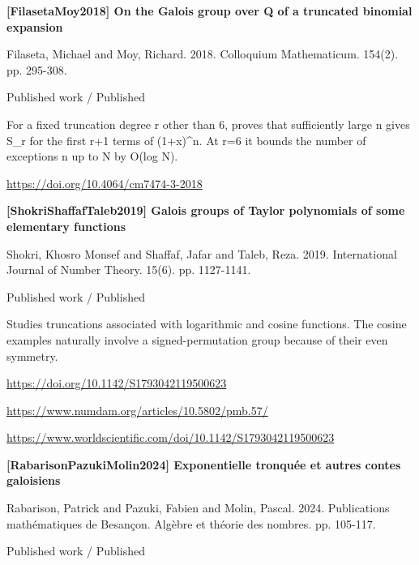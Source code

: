 \documentclass[11pt,a4paper,oneside,openany]{book}
\begin{document}
\hypertarget{ref:FilasetaMoy2018}{}
{\sffamily\bfseries\color{atlasgreen}[FilasetaMoy2018] On the Galois group over Q of a truncated binomial expansion}\par
\color{black} Filaseta, Michael and Moy, Richard. 2018. Colloquium Mathematicum. 154(2). pp. 295-308.\par
{\small\sffamily\color{atlasgold}Published work / Published}\par
\color{black} For a fixed truncation degree r other than 6, proves that sufficiently large n gives S\_\allowbreak{}r for the first r+1 terms of (1+x)\textasciicircum{}n. At r=6 it bounds the number of exceptions n up to N by O(log N).\par
{\footnotesize\url{https://doi.org/10.4064/cm7474-3-2018}}\par
\vspace{9pt}
\hypertarget{ref:ShokriShaffafTaleb2019}{}
{\sffamily\bfseries\color{atlasgreen}[ShokriShaffafTaleb2019] Galois groups of Taylor polynomials of some elementary functions}\par
\color{black} Shokri, Khosro Monsef and Shaffaf, Jafar and Taleb, Reza. 2019. International Journal of Number Theory. 15(6). pp. 1127-1141.\par
{\small\sffamily\color{atlasgold}Published work / Published}\par
\color{black} Studies truncations associated with logarithmic and cosine functions. The cosine examples naturally involve a signed-permutation group because of their even symmetry.\par
{\footnotesize\url{https://doi.org/10.1142/S1793042119500623}}\par
{\footnotesize\url{https://www.numdam.org/articles/10.5802/pmb.57/}}\par
{\footnotesize\url{https://www.worldscientific.com/doi/10.1142/S1793042119500623}}\par
\vspace{9pt}
\hypertarget{ref:RabarisonPazukiMolin2024}{}
{\sffamily\bfseries\color{atlasgreen}[RabarisonPazukiMolin2024] Exponentielle tronquée et autres contes galoisiens}\par
\color{black} Rabarison, Patrick and Pazuki, Fabien and Molin, Pascal. 2024. Publications mathématiques de Besançon. Algèbre et théorie des nombres. pp. 105-117.\par
{\small\sffamily\color{atlasgold}Published work / Published}\par
\end{document}
